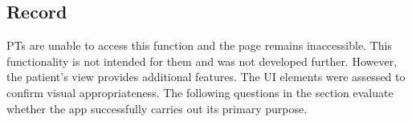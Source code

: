 \documentclass{article} %
\begin{document}
\subsection{Record}
PTs are unable to access this function and the page remains inaccessible. This functionality is not intended for them and was not
developed further. 
However, the patient's view provides additional features. The UI elements were assessed to confirm visual appropriateness. 
The following questions in the section evaluate whether the app successfully carries out its primary purpose. 






\end{document}
